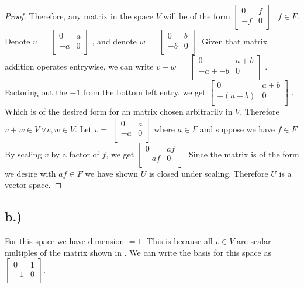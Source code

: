 \documentclass{article}
\begin{document}
\begin{proof}
Therefore, any matrix in the space $V$ will be of the form
$\begin{bmatrix}
	0	&f \\
	-f	&0 \\
\end{bmatrix}$
$ : f \in F$. Denote $v =$
$\begin{bmatrix}
	0	&a \\
	-a	&0 \\
\end{bmatrix}$
, and denote $w =$
$\begin{bmatrix}
	0	&b \\
	-b	&0 \\
\end{bmatrix}$.
Given that matrix addition operates entrywise, we can write $v + w =$
$\begin{bmatrix}
	0	&a + b \\
	-a + -b	&0 \\
\end{bmatrix}$
. Factoring out the $-1$ from the bottom left entry, we get
$\begin{bmatrix}
	0	&a + b \\
	-(a + b)	&0 \\
\end{bmatrix}$
. Which is of the desired form for an matrix chosen arbitrarily in $V$. Therefore $v + w \in V \ \forall v,w \in V$. Let $v =$
$\begin{bmatrix}
	0	&a \\
	-a	&0 \\
\end{bmatrix}$ where $a \in F$ and suppose we have $f \in F$. By scaling $v$ by a factor of $f$, we get 
$\begin{bmatrix}
	0	&af \\
	-af	&0 \\
\end{bmatrix}$. Since the matrix is of the form we desire with $af \in F$ we have shown $U$ is closed under scaling. Therefore $U$ is a vector space.

\end{proof}

\subsection*{b.)}

For this space we have dimension $= 1$. This is because all $v \in V$ are scalar multiples of the matrix shown in . We can write the basis for this space as 
$\begin{bmatrix} 0 &1 \\ -1 &0\\ \end{bmatrix}$.
\end{document}
